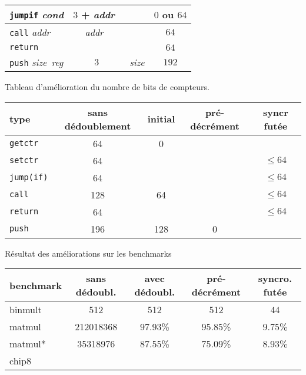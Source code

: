 \documentclass[architecture]{compas2018}
\newcommand{\reg}{\textit{reg}}
\newcommand{\cond}{\textit{cond}}
\newcommand{\size}{\textit{size}}
\newcommand{\addr}{\textit{addr}}
\begin{document}
\begin{table}[!h]
\begin{center}
\begin{tabular}{|l|c|c|c|}
    \hline
    \texttt{jumpif} \cond & $3$ + \addr\       &    & $0$ ou $64$       \\
    \hline
    \texttt{call} \addr   & \addr\             &    & $64$              \\
    \hline
    \texttt{return}       &       &    & $64$              \\
    \hline
    \texttt{push} \size\ \reg          & $3$   & \size           & $192$             \\
    \hline
  \end{tabular}
  \end{center}
Tableau d'amélioration du nombre de bits de compteurs.
  \begin{center}
    \begin{tabular}{|l|c|c|c|c|}
      \hline  
      type   & sans dédoublement  & initial         & pré-décrément & syncr futée    \\
      \hline  
      \hline
      \texttt{getctr}     & 64  & 0   &   &   \\
      \hline
      \texttt{setctr}     & 64  &     &   & $\leqslant 64$ \\
      \hline
      \texttt{jump(if)}   & 64  &     &   & $\leqslant 64$ \\
      \hline
      \texttt{call}       & 128 & 64  &   & $\leqslant 64$ \\
      \hline
      \texttt{return}     & 64  &     &   & $\leqslant64$  \\
      \hline
      \texttt{push}       & 196 & 128 & 0 &  \\
      \hline
    \end{tabular}
  \end{center}
  Résultat des améliorations sur les benchmarks
  \begin{center}
    \begin{tabular}{|l|c|c|c|c|}
      
      \hline  
      benchmark   & sans dédoubl.  & avec dédoubl.  & pré-décrément & syncro. futée    \\
      \hline  
      \hline
      binmult & 512 & 512 & 512 & 44 \\
      \hline
      matmul & 212018368 & 97.93\% & 95.85\% & 9.75\% \\
      \hline
      matmul* & 35318976 & 87.55\% & 75.09\% & 8.93\% \\
      \hline
      chip8 & & & &\\
      \hline
    \end{tabular}
  \end{center}

\end{table}
\end{document}
